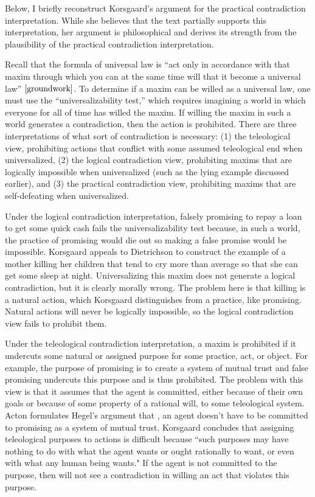 \begin{isabellebody}
\begin{isamarkuptext}
Below, I briefly reconstruct Korsgaard's argument for the practical contradiction interpretation. While 
she believes that the text partially supports this interpretation, her argument is philosophical and 
derives its strength from the plausibility of the practical contradiction interpretation.

Recall that the formula of universal law is “act only in accordance with that maxim through which you can at the 
same time will that it become a universal law” $\cite[4:421]{groundwork}$. To determine if a maxim can be willed as a 
universal law, one must use the “universalizability test,” which requires imagining a world in which 
everyone for all of time has willed the maxim. If willing the maxim in such a world generates a contradiction, 
then the action is prohibited. There are three interpretations of what sort of contradiction is necessary: 
(1) the teleological view, prohibiting actions that conflict with some assumed teleological end when 
universalized, (2) the logical contradiction view, prohibiting maxims that are logically impossible 
when universalized (such as the lying example discussed earlier), and (3) the practical contradiction view, prohibiting maxims that are self-defeating 
when universalized.

Under the logical contradiction interpretation, falsely promising to repay a loan to get some quick cash
fails the universalizability test because, in such a world, the practice of promising would die out so 
making a false promise would be impossible. Korsgaard appeals to Dietrichson \cite{dietrichson} to construct the example of 
a mother killing her children that tend to cry more than average so that she can get some 
sleep at night. Universalizing this maxim does not generate a logical contradiction, but it is clearly 
morally wrong. The problem here is that killing is a natural action, which Korsgaard distinguishes from 
a practice, like promising. Natural actions will never be logically impossible, so the logical contradiction 
view fails to prohibit them.

Under the teleological contradiction interpretation, a maxim is prohibited if it undercuts some natural 
or assigned purpose for some practice, act, or object. For example, the purpose of promising is to 
create a system of mutual trust and false promising undercuts this purpose and is thus prohibited. The problem 
with this view is that it assumes that the agent is committed, either because of their own goals or 
because of some property of a rational will, to some teleological system. Acton formulates Hegel's argument that \cite{acton},
an agent doesn't have to be committed to promising as a system of mutual trust. Korsgaard concludes that 
assigning teleological purposes to actions is difficult because ``such purposes may have
nothing to do with what the agent wants or ought rationally to want, or even with what
any human being wants." If the agent is not committed to the purpose, then will not see a contradiction 
in willing an act that violates this purpose.


\end{isamarkuptext}
\end{isabellebody}
